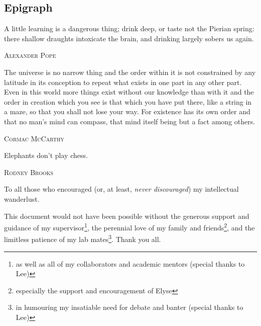 \documentclass[oneandahalfspaced,twoside,11pt]{ut-thesis}
\begin{document}
\begin{preliminary}
\chapter*{Epigraph}
\epigraph{A little learning is a dangerous thing; 
drink deep, or taste not the Pierian spring: 
there shallow draughts intoxicate the brain, 
and drinking largely sobers us again.}{\textsc{Alexander Pope}}
\epigraph{The universe is no narrow thing and the order within it is not constrained by any latitude in its conception to repeat what exists in one part in any other part. Even in this world more things exist without our knowledge than with it and the order in creation which you see is that which you have put there, like a string in a maze, so that you shall not lose your way. For existence has its own order and that no man's mind can compass, that mind itself being but a fact among others.}{\textsc{Cormac McCarthy}}
\epigraph{Elephants don't play chess.}{\textsc{Rodney Brooks}}


\clearpage
	

\begin{dedication}
To all those who encouraged (or, at least, \textit{never discouraged}) my intellectual wanderlust.
\end{dedication}

\newpage  %


\begin{acknowledgements}\noindent This document would not have been possible without the generous support and guidance of my supervisor\footnote{as well as all of my collaborators and academic mentors (special thanks to Lee)}, the perennial love of my family and friends\footnote{especially the support and encouragement of Elyse}, and the limitless patience of my lab mates\footnote{in humouring my insatiable need for debate and banter (special thanks to Lee)}. Thank you all.
\end{acknowledgements}


\end{preliminary}
\end{document}
